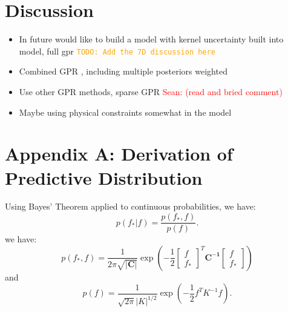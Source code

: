 \documentclass[10pt]{article}
\newcommand{\Sean}[1]{{\textcolor{red}{{Sean: #1}} }}
\newcommand{\todo}[1]{\textcolor{orange}{\texttt{TODO: #1}}}
\begin{document}
\section{Discussion}
\begin{itemize}
    \item In future would like to build a model with kernel uncertainty built into model, full gpr
    \todo{Add the 7D discussion here}
    \item Combined GPR , including multiple posteriors weighted
    \item Use other GPR methods, sparse GPR \Sean{(read and bried comment)}
    \item Maybe using physical constraints somewhat in the model
\end{itemize}

\appendix

\section{Appendix A: Derivation of Predictive Distribution}
\label{appendix:A}
Using Bayes' Theorem applied to continuous probabilities, we have:
\[
p(f_* | f) = \frac{p(f_*, f)}{p(f)}.
\]
we have:
$$p(f_*,f) = \frac{1}{2\pi\sqrt{\mathbf{|C|}}}\exp \left(-\frac{1}{2} 
\begin{bmatrix} f \\ f_*  \end{bmatrix}^T\mathbf{C^{-1}}\begin{bmatrix} f  \\ f_* \end{bmatrix}\right)$$
and 
\[
p(f) = \frac{1}{\sqrt{2\pi} |K|^{1/2}}
\exp \left(-\frac{1}{2} f^T K^{-1} f \right).
\]
\end{document}
